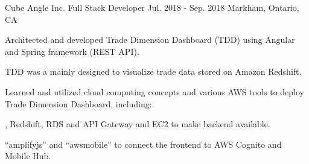 \begin{cventries}
  \cventry
    {Cube Angle Inc.} %
    {Full Stack Developer} %
    {Jul. 2018 - Sep. 2018} %
    {Markham, Ontario, CA} %
    {
      \begin{cvitems} %
        \item {Architected and developed Trade Dimension Dashboard (TDD) using Angular and Spring framework (REST API).}
          \begin{cvsubitems}
            \item {TDD was a  mainly designed to visualize trade data stored on Amazon Redshift.}
          \end{cvsubitems}
        \item {Learned and utilized cloud computing concepts and various AWS tools to deploy Trade Dimension Dashboard, including:}
          \begin{cvsubitems}
            \item {, Redshift, RDS and API Gateway and  EC2 to make backend available.}
            \item {“amplifyjs” and “awsmobile” to connect the frontend to AWS Cognito and Mobile Hub.}
          \end{cvsubitems}
      \end{cvitems}
    }


\end{cventries}
